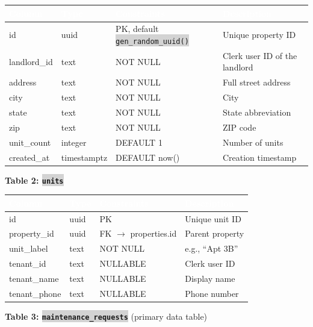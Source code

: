 \documentclass[11pt, a4paper]{article}
\newcommand{\code}[1]{\texttt{\small\colorbox{lightgray}{#1}}}
\begin{document}
\begin{tabularx}{\textwidth}{|l|l|l|X|}
\hline
\rowcolor{primary}
\textcolor{white}{\textbf{Column}} & \textcolor{white}{\textbf{Type}} & \textcolor{white}{\textbf{Constraints}} & \textcolor{white}{\textbf{Description}} \\
\hline
id & uuid & PK, default \code{gen\_random\_uuid()} & Unique property ID \\
\hline
landlord\_id & text & NOT NULL & Clerk user ID of the landlord \\
\hline
address & text & NOT NULL & Full street address \\
\hline
city & text & NOT NULL & City \\
\hline
state & text & NOT NULL & State abbreviation \\
\hline
zip & text & NOT NULL & ZIP code \\
\hline
unit\_count & integer & DEFAULT 1 & Number of units \\
\hline
created\_at & timestamptz & DEFAULT now() & Creation timestamp \\
\hline
\end{tabularx}

\vspace{0.5em}

\textbf{Table 2: \code{units}}

\begin{tabularx}{\textwidth}{|l|l|l|X|}
\hline
\rowcolor{primary}
\textcolor{white}{\textbf{Column}} & \textcolor{white}{\textbf{Type}} & \textcolor{white}{\textbf{Constraints}} & \textcolor{white}{\textbf{Description}} \\
\hline
id & uuid & PK & Unique unit ID \\
\hline
property\_id & uuid & FK $\rightarrow$ properties.id & Parent property \\
\hline
unit\_label & text & NOT NULL & e.g., ``Apt 3B'' \\
\hline
tenant\_id & text & NULLABLE & Clerk user ID \\
\hline
tenant\_name & text & NULLABLE & Display name \\
\hline
tenant\_phone & text & NULLABLE & Phone number \\
\hline
\end{tabularx}

\vspace{0.5em}

\textbf{Table 3: \code{maintenance\_requests}} (primary data table)
\end{document}

